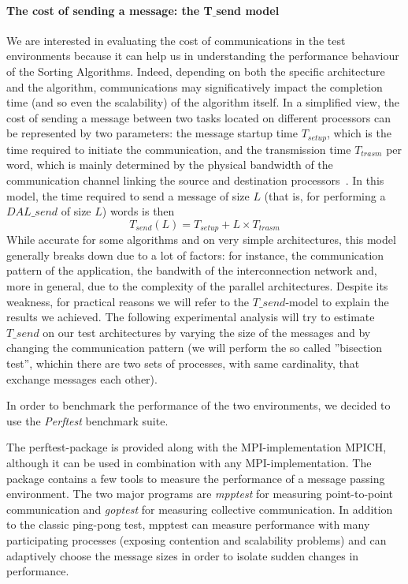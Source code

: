 \paragraph{The cost of sending a message: the T$\_$send model}
We are interested in evaluating the cost of communications in the test environments because it can help us in understanding the performance behaviour of the Sorting Algorithms. Indeed, depending on both the specific architecture and the algorithm, communications may significatively impact the completion time (and so even the scalability) of the algorithm itself. In a simplified view, the cost of sending a message between two tasks located on different processors can be represented by two parameters: the message startup time $T_{setup}$, which is the time required to initiate the communication, and the transmission time $T_{trasm}$ per word, which is mainly determined by the physical bandwidth of the communication channel linking the source and destination processors~\cite{VANN}. In this model, the time required to send a message of size $L$ (that is, for performing a $DAL\_send$ of size $L$) words is then
\[
T_{send}(L) = T_{setup} + L \times T_{trasm}
\]
While accurate for some algorithms and on very simple architectures, this model generally breaks down due to a lot of factors: for instance, the communication pattern of the application, the bandwith of the interconnection network and, more in general, due to the complexity of the parallel architectures. Despite its weakness, for practical reasons we will refer to the $T\_send$-model to explain the results we achieved.  
The following experimental analysis will try to estimate $T\_send$ on our test architectures by varying the size of the messages and by changing the communication pattern (we will perform the so called ''bisection test'', whichin there are two sets of processes, with same cardinality, that exchange messages each other). 

In order to benchmark the performance of the two environments, we decided to use the \textit{Perftest} benchmark suite.

The perftest-package is provided along with the MPI-implementation MPICH, although it can be used in combination with any MPI-implementation. The package contains a few tools to measure the performance of a message passing environment. The two major programs are \textit{mpptest} for measuring point-to-point communication and \textit{goptest} for measuring collective communication. In addition to the classic ping-pong test, mpptest can measure performance with many participating processes (exposing contention and scalability problems) and can adaptively choose the message sizes in order to isolate sudden changes in performance. 

